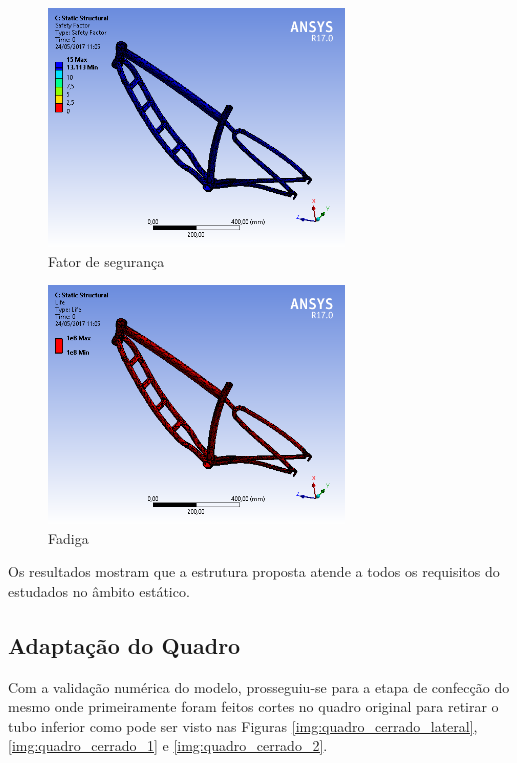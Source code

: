 	\begin{figure}[!htb]
		\centering
		\includegraphics[width=0.7\textwidth]{inter_fator_de_seguranca.png}
		\caption{Fator de segurança}
		\label{img:inter_fator_de_seguranca}
	\end{figure}

	\begin{figure}[!htb]
		\centering
		\includegraphics[width=0.7\textwidth]{inter_fadiga.png}
		\caption{Fadiga}
		\label{img:inter_fadiga}
	\end{figure}
	Os resultados mostram que a estrutura proposta atende a todos os requisitos do estudados no âmbito estático.
	
	\subsection{Adaptação do Quadro}
	
	Com a validação numérica do modelo, prosseguiu-se para a etapa de confecção do mesmo onde primeiramente foram feitos cortes no quadro original para retirar o tubo inferior como pode ser visto nas Figuras \ref{img:quadro_cerrado_lateral}, \ref{img:quadro_cerrado_1} e \ref{img:quadro_cerrado_2}.
	

